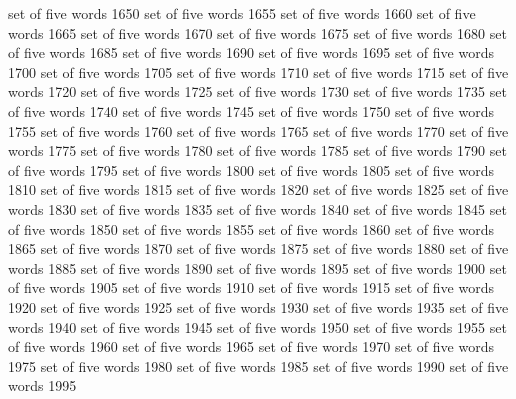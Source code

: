 set	of	five	words	1650
set	of	five	words	1655
set	of	five	words	1660
set	of	five	words	1665
set	of	five	words	1670
set	of	five	words	1675
set	of	five	words	1680
set	of	five	words	1685
set	of	five	words	1690
set	of	five	words	1695
set	of	five	words	1700
set	of	five	words	1705
set	of	five	words	1710
set	of	five	words	1715
set	of	five	words	1720
set	of	five	words	1725
set	of	five	words	1730
set	of	five	words	1735
set	of	five	words	1740
set	of	five	words	1745
set	of	five	words	1750
set	of	five	words	1755
set	of	five	words	1760
set	of	five	words	1765
set	of	five	words	1770
set	of	five	words	1775
set	of	five	words	1780
set	of	five	words	1785
set	of	five	words	1790
set	of	five	words	1795
set	of	five	words	1800
set	of	five	words	1805
set	of	five	words	1810
set	of	five	words	1815
set	of	five	words	1820
set	of	five	words	1825
set	of	five	words	1830
set	of	five	words	1835
set	of	five	words	1840
set	of	five	words	1845
set	of	five	words	1850
set	of	five	words	1855
set	of	five	words	1860
set	of	five	words	1865
set	of	five	words	1870
set	of	five	words	1875
set	of	five	words	1880
set	of	five	words	1885
set	of	five	words	1890
set	of	five	words	1895
set	of	five	words	1900
set	of	five	words	1905
set	of	five	words	1910
set	of	five	words	1915
set	of	five	words	1920
set	of	five	words	1925
set	of	five	words	1930
set	of	five	words	1935
set	of	five	words	1940
set	of	five	words	1945
set	of	five	words	1950
set	of	five	words	1955
set	of	five	words	1960
set	of	five	words	1965
set	of	five	words	1970
set	of	five	words	1975
set	of	five	words	1980
set	of	five	words	1985
set	of	five	words	1990
set	of	five	words	1995
